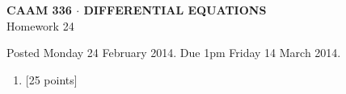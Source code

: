 \documentclass[10pt]{article}
\begin{document}
\vspace*{-5em}
\begin{center}
\large \textsf{\textbf{CAAM 336 $\cdot$ DIFFERENTIAL EQUATIONS}\\[0.5em]
Homework 24 }
\end{center}

Posted Monday 24 February 2014. Due 1pm Friday 14 March 2014.

\begin{enumerate}\addtocounter{enumi}{23}
\item {[25 points]}  
\end{enumerate}
\end{document}
